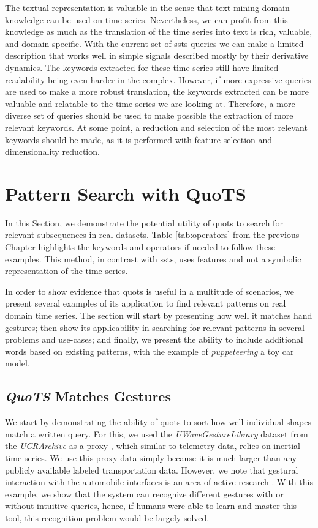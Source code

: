 \par
The textual representation is valuable in the sense that text mining domain knowledge can be used on time series. Nevertheless, we can profit from this knowledge as much as the translation of the time series into text is rich, valuable, and domain-specific. With the current set of \gls{ssts} queries we can make a limited description that works well in simple signals described mostly by their derivative dynamics. The keywords extracted for these time series still have limited readability being even harder in the complex. However, if more expressive queries are used to make a more robust translation, the keywords extracted can be more valuable and relatable to the time series we are looking at. Therefore, a more diverse set of queries should be used to make possible the extraction of more relevant keywords. At some point, a reduction and selection of the most relevant keywords should be made, as it is performed with feature selection and dimensionality reduction.

\section{Pattern Search with QuoTS}

In this Section, we demonstrate the potential utility of \gls{quots} to search for relevant subsequences in real datasets. Table \ref{tab:operators} from the previous Chapter highlights the keywords and operators if needed to follow these examples. This method, in contrast with \gls{ssts}, uses features and not a symbolic representation of the time series.
\par
In order to show evidence that \gls{quots} is useful in a multitude of scenarios, we present several examples of its application to find relevant patterns on real domain time series. The section will start by presenting how well it matches hand gestures; then show its applicability in searching for relevant patterns in several problems and use-cases; and finally, we present the ability to include additional words based on existing patterns, with the example of \textit{puppeteering} a toy car model.

\subsection{\textit{QuoTS} Matches Gestures}

We start by demonstrating the ability of \gls{quots} to sort how well individual shapes match a written query. For this, we used the \textit{UWaveGestureLibrary} dataset from the \textit{UCRArchive} as a proxy \cite{uWave}, which similar to telemetry data, relies on inertial time series. We use this proxy data simply because it is much larger than any publicly available labeled transportation data. However, we note that gestural interaction with the automobile interfaces is an area of active research \cite{autoui1, autoui2}. With this example, we show that the system can recognize different gestures with or without intuitive queries, hence, if humans were able to learn and master this tool, this recognition problem would be largely solved.

